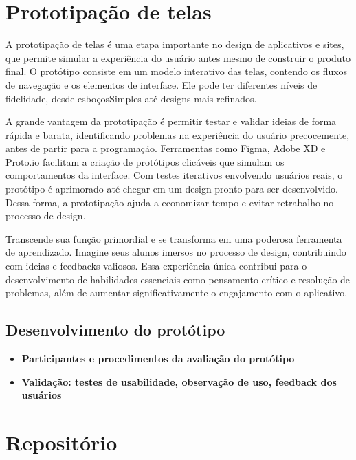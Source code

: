 \section{Prototipação de telas}

A prototipação de telas é uma etapa importante no design de aplicativos e sites, que permite simular a experiência do usuário antes mesmo de construir o produto final. O protótipo consiste em um modelo interativo das telas, contendo os fluxos de navegação e os elementos de interface. Ele pode ter diferentes níveis de fidelidade, desde esboçosSimples até designs mais refinados. 

A grande vantagem da prototipação é permitir testar e validar ideias de forma rápida e barata, identificando problemas na experiência do usuário precocemente, antes de partir para a programação. Ferramentas como Figma, Adobe XD e Proto.io facilitam a criação de protótipos clicáveis que simulam os comportamentos da interface. Com testes iterativos envolvendo usuários reais, o protótipo é aprimorado até chegar em um design pronto para ser desenvolvido. Dessa forma, a prototipação ajuda a economizar tempo e evitar retrabalho no processo de design.

Transcende sua função primordial e se transforma em uma poderosa ferramenta de aprendizado. Imagine seus alunos imersos no processo de design, contribuindo com ideias e feedbacks valiosos. Essa experiência única contribui para o desenvolvimento de habilidades essenciais como pensamento crítico e resolução de problemas, além de aumentar significativamente o engajamento com o aplicativo.



\subsection{Desenvolvimento do protótipo}


\begin{itemize}
    \item \textbf{Participantes e procedimentos da avaliação do protótipo}
    \item \textbf{Validação: testes de usabilidade, observação de uso, feedback dos usuários}
    
\end{itemize}

\section{Repositório}

